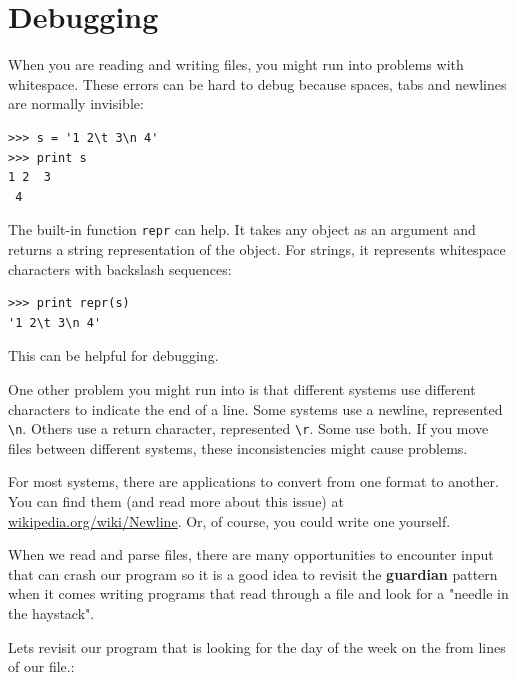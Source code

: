 \documentclass[10pt]{book}
\begin{document}


\section{Debugging}


When you are reading and writing files, you might run into problems
with whitespace.  These errors can be hard to debug because spaces,
tabs and newlines are normally invisible:

\beforeverb
\begin{verbatim}
>>> s = '1 2\t 3\n 4'
>>> print s
1 2	 3
 4
\end{verbatim}
\afterverb


The built-in function {\tt repr} can help.  It takes any object as an
argument and returns a string representation of the object.  For
strings, it represents whitespace
characters with backslash sequences:

\beforeverb
\begin{verbatim}
>>> print repr(s)
'1 2\t 3\n 4'
\end{verbatim}
\afterverb

This can be helpful for debugging.

One other problem you might run into is that different systems
use different characters to indicate the end of a line.  Some
systems use a newline, represented \verb"\n".  Others use
a return character, represented \verb"\r".  Some use both.
If you move files between different systems, these inconsistencies
might cause problems.


For most systems, there are applications to convert from one
format to another.  You can find them (and read more about this
issue) at \url{wikipedia.org/wiki/Newline}.  Or, of course, you
could write one yourself.


When we read and parse files, there are many opportunities
to encounter input that can crash our program so it is a good 
idea to revisit the {\bf guardian} pattern when it comes
writing programs that read through a file 
and look for a "needle in the haystack".

Lets revisit our program that is looking for the day of the
week on the from lines of our file.:
\end{document}
